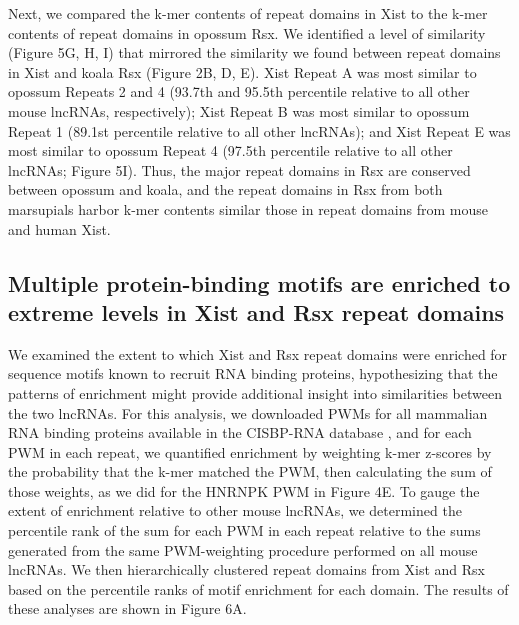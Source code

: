 Next, we compared the k-mer contents of repeat domains in Xist to the k-mer contents of repeat domains in opossum Rsx. We identified a level of similarity (Figure 5G, H, I) that mirrored the similarity we found between repeat domains in Xist and koala Rsx (Figure 2B, D, E). Xist Repeat A was most similar to opossum Repeats 2 and 4 (93.7th and 95.5th percentile relative to all other mouse lncRNAs, respectively); Xist Repeat B was most similar to opossum Repeat 1 (89.1st percentile relative to all other lncRNAs); and Xist Repeat E was most similar to opossum Repeat 4 (97.5th percentile relative to all other lncRNAs; Figure 5I). Thus, the major repeat domains in Rsx are conserved between opossum and koala, and the repeat domains in Rsx from both marsupials harbor k-mer contents similar those in repeat domains from mouse and human Xist.

\subsection{Multiple protein-binding motifs are enriched to extreme levels in Xist and Rsx repeat domains}
We examined the extent to which Xist and Rsx repeat domains were enriched for sequence motifs known to recruit RNA binding proteins, hypothesizing that the patterns of enrichment might provide additional insight into similarities between the two lncRNAs. For this analysis, we downloaded PWMs for all mammalian RNA binding proteins available in the CISBP-RNA database \cite{Ray2013ARegulation}, and for each PWM in each repeat, we quantified enrichment by weighting k-mer z-scores by the probability that the k-mer matched the PWM, then calculating the sum of those weights, as we did for the HNRNPK PWM in Figure 4E. To gauge the extent of enrichment relative to other mouse lncRNAs, we determined the percentile rank of the sum for each PWM in each repeat relative to the sums generated from the same PWM-weighting procedure performed on all mouse lncRNAs. We then hierarchically clustered repeat domains from Xist and Rsx based on the percentile ranks of motif enrichment for each domain. The results of these analyses are shown in Figure 6A.

